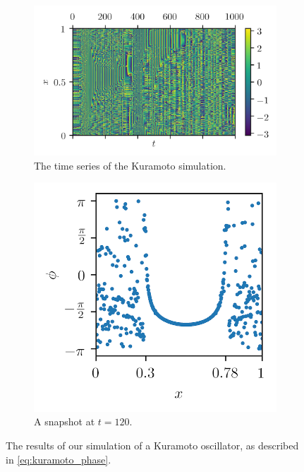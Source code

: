 \begin{figure}[ht]
  \centering
  \begin{subfigure}{0.6\textwidth}
    \centering
    \includegraphics[width=\textwidth]{figure/kuramoto_overhead}
    \caption{The time series of the Kuramoto simulation.}
    \label{fig:kuramoto_overhead}
  \end{subfigure} %
  \begin{subfigure}{0.35\textwidth}
    \centering
    \includegraphics[width=\textwidth]{figure/kuramoto_snapshot}
    \caption{A snapshot at $t = 120$.}
    \label{fig:kuramoto_snapshot}
  \end{subfigure}
  \caption[Kuramoto simulation]{The results of our simulation of a Kuramoto oscillator, as described in \cref{eq:kuramoto_phase}.
}
\end{figure}
